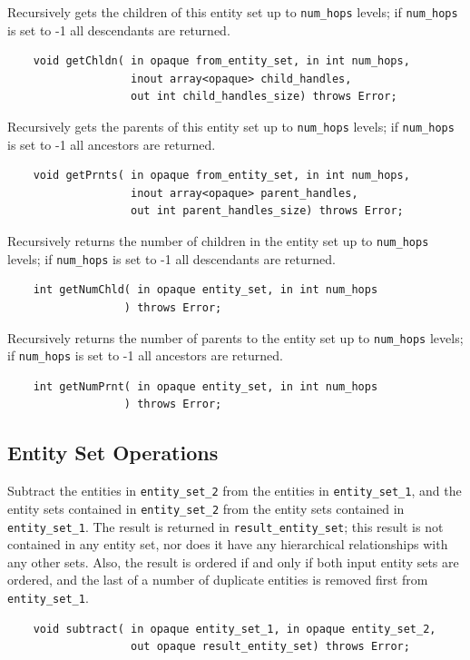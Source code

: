 \documentclass{article}
\begin{document}
Recursively gets the children of this entity set up to {\tt num\_hops} 
levels; if {\tt num\_hops} is set to -1 all descendants are returned.
\begin{verbatim}
    void getChldn( in opaque from_entity_set, in int num_hops,
                   inout array<opaque> child_handles,
                   out int child_handles_size) throws Error;
\end{verbatim}

Recursively gets the parents of this entity set up to {\tt num\_hops} 
levels; if {\tt num\_hops} is set to -1 all ancestors are returned.
\begin{verbatim}
    void getPrnts( in opaque from_entity_set, in int num_hops,
                   inout array<opaque> parent_handles,
                   out int parent_handles_size) throws Error;
\end{verbatim}

Recursively returns the number of children in the entity set 
up to {\tt num\_hops} levels; if {\tt num\_hops} is set to -1 all descendants 
are returned.
\begin{verbatim}
    int getNumChld( in opaque entity_set, in int num_hops
                  ) throws Error;
\end{verbatim}

Recursively returns the number of parents to the entity set up 
to {\tt num\_hops} levels; if {\tt num\_hops} is set to -1 all ancestors are 
returned.
\begin{verbatim}
    int getNumPrnt( in opaque entity_set, in int num_hops
                  ) throws Error;
\end{verbatim}

\subsection{Entity Set Operations}

Subtract the entities in {\tt entity\_set\_2} from the entities in
{\tt entity\_set\_1}, 
and the entity sets contained in {\tt entity\_set\_2} from the entity 
sets contained in {\tt entity\_set\_1}. The result is returned 
in {\tt result\_entity\_set}; this result is not contained in any entity 
set, nor does it have any hierarchical relationships with any 
other sets. Also, the result is ordered if and only if 
both input entity sets are ordered, and the last of a number 
of duplicate entities is removed first from {\tt entity\_set\_1}.
\begin{verbatim}
    void subtract( in opaque entity_set_1, in opaque entity_set_2,
                   out opaque result_entity_set) throws Error;
\end{verbatim}
\end{document}

